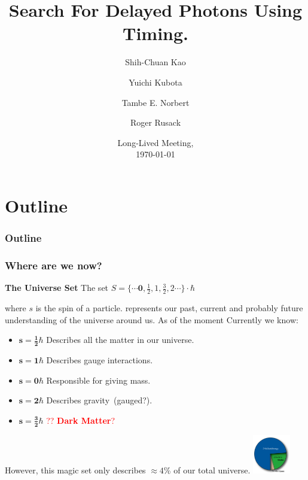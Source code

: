 \documentclass{beamer}
\title{Search For Delayed Photons Using Timing.}
\author[Tambe E. Norbert] %
{Shih-Chuan Kao\inst{1} \and Yuichi Kubota\inst{1} \and Tambe E. Norbert\inst{1} \and Roger Rusack\inst{1}}
\institute[UMN]{
\inst{1}%
University Of Minnesota
}
\date{ Long-Lived Meeting,\\ \today}
\begin{document}
\begin{frame}
\titlepage
\begin{center}
\href{mailto:norbe072@umn.edu}{}
\end{center}
\end{frame}
\section*{Outline}
\begin{frame}
\frametitle{\Huge Outline}
\tableofcontents
\end{frame}

\begin{frame}
\frametitle{\huge{Where are we now?}}
\begin{varblock}[7cm]{\textbf{The Universe Set}}
 The set  $S =\{ \cdots \mathbf{0}, \frac{1}{2}, 1,  \frac{3}{2}, 2  \cdots \} \cdot \hbar $ 
 \end{varblock}
 where $s$ is the spin of a particle. 
 represents our past, current and probably future understanding of the universe around us. As of the moment 
Currently we know:
 \begin{itemize}
  \item $\mathbf{s = \frac{1}{2}\hbar}$ Describes all the matter in our universe.
  \item $\mathbf{s = 1\hbar}$ Describes gauge interactions.
  \item $\mathbf{s = 0\hbar}$ Responsible for giving mass.
  \item $\mathbf{s = 2\hbar}$ Describes gravity~(gauged?).
  \item $\mathbf{s = \frac{3}{2}\hbar}$ \textcolor{red}{?? \textbf{Dark Matter}?}
 \end{itemize}

However, this magic set only describes $\approx 4$\% of our total universe.
\includegraphics[height=1.7cm,width=0.25\paperwidth]{THESISPLOTS/UniversePie30.jpg}
\end{frame}



\end{document}
